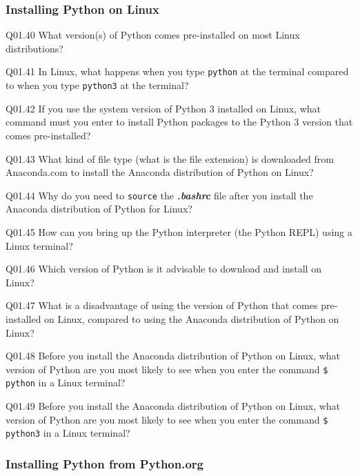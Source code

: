 \documentclass{book}
\newenvironment{problems}{}{}  %
\begin{document}
    




    
        \subsubsection{Installing Python on
Linux}\label{installing-python-on-linux}
    




    
        \begin{problems}
        Q01.40 What version(s) of Python comes pre-installed on most Linux
distributions?

Q01.41 In Linux, what happens when you type \lstinline!python! at the
terminal compared to when you type \lstinline!python3! at the terminal?

Q01.42 If you use the system version of Python 3 installed on Linux,
what command must you enter to install Python packages to the Python 3
version that comes pre-installed?

Q01.43 What kind of file type (what is the file extension) is downloaded
from Anaconda.com to install the Anaconda distribution of Python on
Linux?

Q01.44 Why do you need to \lstinline!source! the \textbf{\emph{.bashrc}}
file after you install the Anaconda distribution of Python for Linux?

Q01.45 How can you bring up the Python interpreter (the Python REPL)
using a Linux terminal?

Q01.46 Which version of Python is it advisable to download and install
on Linux?

Q01.47 What is a disadvantage of using the version of Python that comes
pre-installed on Linux, compared to using the Anaconda distribution of
Python on Linux?

Q01.48 Before you install the Anaconda distribution of Python on Linux,
what version of Python are you most likely to see when you enter the
command \lstinline!$ python! in a Linux terminal?

Q01.49 Before you install the Anaconda distribution of Python on Linux,
what version of Python are you most likely to see when you enter the
command \lstinline!$ python3! in a Linux terminal?
        \end{problems}

    




    
        \subsubsection{Installing Python from
Python.org}\label{installing-python-from-python.org}
    
\end{document}
